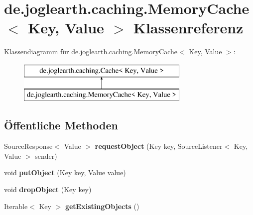 \section{de.\-joglearth.\-caching.\-Memory\-Cache$<$ \-Key, \-Value $>$ \-Klassenreferenz}
\label{classde_1_1joglearth_1_1caching_1_1_memory_cache_3_01_key_00_01_value_01_4}
\-Klassendiagramm für de.\-joglearth.\-caching.\-Memory\-Cache$<$ \-Key, \-Value $>$\-:\begin{figure}[H]
\begin{center}
\leavevmode
\includegraphics[height=2.000000cm]{classde_1_1joglearth_1_1caching_1_1_memory_cache_3_01_key_00_01_value_01_4}
\end{center}
\end{figure}
\subsection*{Öffentliche \-Methoden}
\begin{DoxyCompactItemize}
\item 
\-Source\-Response$<$ \-Value $>$ {\bfseries request\-Object} (\-Key key, \-Source\-Listener$<$ \-Key, \-Value $>$ sender)\label{classde_1_1joglearth_1_1caching_1_1_memory_cache_3_01_key_00_01_value_01_4_a21c160a186d8c8c2606a0ddc4ef6f220}

\item 
void {\bfseries put\-Object} (\-Key key, \-Value value)\label{classde_1_1joglearth_1_1caching_1_1_memory_cache_3_01_key_00_01_value_01_4_aae40ac332dfe8e2e6bca56652a793f75}

\item 
void {\bfseries drop\-Object} (\-Key key)\label{classde_1_1joglearth_1_1caching_1_1_memory_cache_3_01_key_00_01_value_01_4_a1e7ac34212abfc70652a8d8b8de78f37}

\item 
\-Iterable$<$ \-Key $>$ {\bfseries get\-Existing\-Objects} ()\label{classde_1_1joglearth_1_1caching_1_1_memory_cache_3_01_key_00_01_value_01_4_a7bcc89346baa38b5665066d145c570cb}

\end{DoxyCompactItemize}
